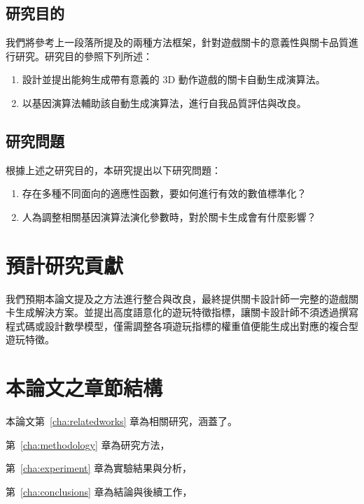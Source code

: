 \subsection{研究目的}

我們將參考上一段落所提及的兩種方法框架，針對遊戲關卡的意義性與關卡品質進行研究。研究目的參照下列所述：

\begin{enumerate}
  \setlength\itemsep{-0.5em}
  \item 設計並提出能夠生成帶有意義的 3D 動作遊戲的關卡自動生成演算法。
  \item 以基因演算法輔助該自動生成演算法，進行自我品質評估與改良。
\end{enumerate}

\subsection{研究問題}

根據上述之研究目的，本研究提出以下研究問題：

\begin{enumerate}
  \setlength\itemsep{-0.5em}
  \item 存在多種不同面向的適應性函數，要如何進行有效的數值標準化？
  \item 人為調整相關基因演算法演化參數時，對於關卡生成會有什麼影響？
\end{enumerate}

\section{預計研究貢獻}

我們預期本論文提及之方法進行整合與改良，最終提供關卡設計師一完整的遊戲關卡生成解決方案。並提出高度語意化的遊玩特徵指標，讓關卡設計師不須透過撰寫程式碼或設計數學模型，僅需調整各項遊玩指標的權重值便能生成出對應的複合型遊玩特徵。

\section{本論文之章節結構}

本論文第~\ref{cha:relatedworks} 章為相關研究，涵蓋了。

第~\ref{cha:methodology} 章為研究方法，

第~\ref{cha:experiment} 章為實驗結果與分析，

第~\ref{cha:conclusions} 章為結論與後續工作，